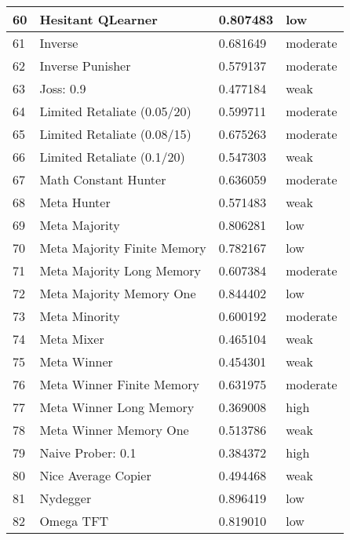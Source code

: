 \begin{longtable}{|p{0.5cm}||p{6cm}||p{4cm}||p{2cm}|}
			60  & Hesitant QLearner           & 0.807483          & low      \\ \hline
			61  & Inverse                     & 0.681649          & moderate \\ \hline
			62  & Inverse Punisher            & 0.579137          & moderate \\ \hline
			63  & Joss: 0.9                   & 0.477184          & weak     \\ \hline
			64  & Limited Retaliate (0.05/20) & 0.599711          & moderate \\ \hline
			65  & Limited Retaliate (0.08/15) & 0.675263          & moderate \\ \hline
			66  & Limited Retaliate (0.1/20)  & 0.547303          & weak     \\ \hline
			67  & Math Constant Hunter        & 0.636059          & moderate \\ \hline
			68  & Meta Hunter                 & 0.571483          & weak     \\ \hline
			69  & Meta Majority               & 0.806281          & low      \\ \hline
			70  & Meta Majority Finite Memory & 0.782167          & low      \\ \hline
			71  & Meta Majority Long Memory   & 0.607384          & moderate \\ \hline
			72  & Meta Majority Memory One    & 0.844402          & low      \\ \hline
			73  & Meta Minority               & 0.600192          & moderate \\ \hline
			74  & Meta Mixer                  & 0.465104          & weak     \\ \hline
			75  & Meta Winner                 & 0.454301          & weak     \\ \hline
			76  & Meta Winner Finite Memory   & 0.631975          & moderate \\ \hline
			77  & Meta Winner Long Memory     & 0.369008          & high     \\ \hline
			78  & Meta Winner Memory One      & 0.513786          & weak     \\ \hline
			79  & Naive Prober: 0.1           & 0.384372          & high     \\ \hline
			80  & Nice Average Copier         & 0.494468          & weak     \\ \hline
			81  & Nydegger                    & 0.896419          & low      \\ \hline
			82  & Omega TFT                   & 0.819010          & low      \\ \hline

\end{longtable}
